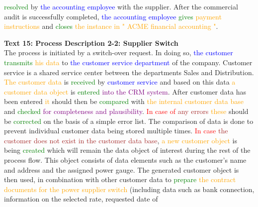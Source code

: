 \textcolor{green}{resolved} by \textcolor{blue}{the} \textcolor{blue}{accounting} \textcolor{blue}{employee} with the supplier. After the commercial audit is successfully completed, \textcolor{blue}{the} \textcolor{blue}{accounting} \textcolor{blue}{employee} \textcolor{green}{gives} \textcolor{orange}{payment} \textcolor{orange}{instructions} and \textcolor{green}{closes} \textcolor{orange}{the} \textcolor{orange}{instance} \textcolor{orange}{in} \textcolor{orange}{"} \textcolor{orange}{ACME} \textcolor{orange}{financial} \textcolor{orange}{accounting} \textcolor{orange}{"}.

\textbf{Text 15: Process Description 2-2: Supplier Switch}\\
The process is initiated by a switch-over request. In doing so, \textcolor{blue}{the} \textcolor{blue}{customer} \textcolor{green}{transmits} \textcolor{orange}{his} \textcolor{orange}{data} to \textcolor{blue}{the} \textcolor{blue}{customer} \textcolor{blue}{service} \textcolor{blue}{department} of the company. Customer service is a shared service center between the departments Sales and Distribution. \textcolor{orange}{The} \textcolor{orange}{customer} \textcolor{orange}{data} is \textcolor{green}{received} by \textcolor{blue}{customer} \textcolor{blue}{service} and based on this data \textcolor{orange}{a} \textcolor{orange}{customer} \textcolor{orange}{data} \textcolor{orange}{object} is \textcolor{green}{entered} \textcolor{purple}{into} \textcolor{purple}{the} \textcolor{purple}{CRM} \textcolor{purple}{system}. After customer data has been entered \textcolor{orange}{it} should then be \textcolor{green}{compared} with \textcolor{orange}{the} \textcolor{orange}{internal} \textcolor{orange}{customer} \textcolor{orange}{data} \textcolor{orange}{base} and \textcolor{green}{checked} \textcolor{purple}{for} \textcolor{purple}{completeness} \textcolor{purple}{and} \textcolor{purple}{plausibility}. \textcolor{red}{In} \textcolor{red}{case} \textcolor{red}{of} \textcolor{brown}{any} \textcolor{brown}{errors} \textcolor{orange}{these} should be \textcolor{green}{corrected} on the basis of a simple error list. The comparison of data is done to prevent individual customer data being stored multiple times. \textcolor{red}{In} \textcolor{red}{case} \textcolor{brown}{the} \textcolor{brown}{customer} \textcolor{brown}{does} \textcolor{brown}{not} \textcolor{brown}{exist} \textcolor{brown}{in} \textcolor{brown}{the} \textcolor{brown}{customer} \textcolor{brown}{data} \textcolor{brown}{base}, \textcolor{orange}{a} \textcolor{orange}{new} \textcolor{orange}{customer} \textcolor{orange}{object} is being \textcolor{green}{created} which will remain the data object of interest during the rest of the process flow. This object consists of data elements such as the customer's name and address and the assigned power gauge. The generated customer object is then used, in combination with other customer data to \textcolor{green}{prepare} \textcolor{orange}{the} \textcolor{orange}{contract} \textcolor{orange}{documents} \textcolor{orange}{for} \textcolor{orange}{the} \textcolor{orange}{power} \textcolor{orange}{supplier} \textcolor{orange}{switch} (including data such as bank connection, information on the selected rate, requested date of 